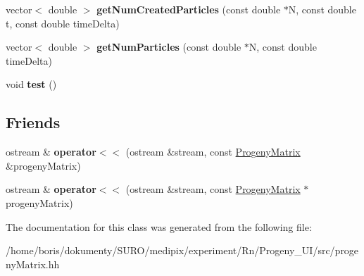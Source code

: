 \begin{DoxyCompactItemize}
\item 
\hypertarget{classProgenyMatrix_af7c7f969cd87add705bd2a6aa1bf323d}{vector$<$ double $>$ {\bfseries get\-Num\-Created\-Particles} (const double $\ast$N, const double t, const double time\-Delta)}\label{classProgenyMatrix_af7c7f969cd87add705bd2a6aa1bf323d}

\item 
\hypertarget{classProgenyMatrix_a9420c56c7afbb8950822da28ab7249c9}{vector$<$ double $>$ {\bfseries get\-Num\-Particles} (const double $\ast$N, const double time\-Delta)}\label{classProgenyMatrix_a9420c56c7afbb8950822da28ab7249c9}

\item 
\hypertarget{classProgenyMatrix_a610583b083ef3a46ff2471d4ab06412e}{void {\bfseries test} ()}\label{classProgenyMatrix_a610583b083ef3a46ff2471d4ab06412e}

\end{DoxyCompactItemize}
\subsection*{Friends}
\begin{DoxyCompactItemize}
\item 
\hypertarget{classProgenyMatrix_ab98de18a4e21a01349e72a4a5ebfef6d}{ostream \& {\bfseries operator$<$$<$} (ostream \&stream, const \hyperlink{classProgenyMatrix}{Progeny\-Matrix} \&progeny\-Matrix)}\label{classProgenyMatrix_ab98de18a4e21a01349e72a4a5ebfef6d}

\item 
\hypertarget{classProgenyMatrix_a849973a8862cb5f5343512e200fe2687}{ostream \& {\bfseries operator$<$$<$} (ostream \&stream, const \hyperlink{classProgenyMatrix}{Progeny\-Matrix} $\ast$progeny\-Matrix)}\label{classProgenyMatrix_a849973a8862cb5f5343512e200fe2687}

\end{DoxyCompactItemize}


The documentation for this class was generated from the following file\-:\begin{DoxyCompactItemize}
\item 
/home/boris/dokumenty/\-S\-U\-R\-O/medipix/experiment/\-Rn/\-Progeny\-\_\-\-U\-I/src/progeny\-Matrix.\-hh\end{DoxyCompactItemize}
